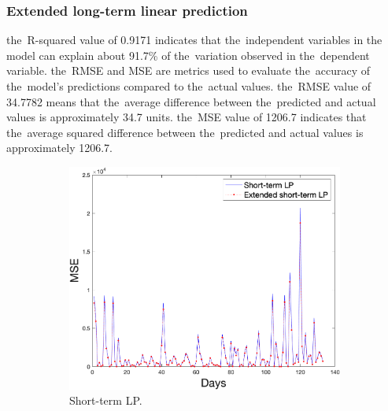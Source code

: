     \subsubsection{Extended long-term linear prediction} \label{subsec:res_eltlp}
     the~R-squared value of 0.9171 indicates that the~independent variables in the
    model can explain about 91.7\% of the~variation observed in the~dependent variable.
     the~RMSE and MSE are metrics used to evaluate the~accuracy of the~model's predictions
    compared to the~actual values. the~RMSE value of 34.7782 means that the~average difference
    between the~predicted and actual values is approximately 34.7 units. the~MSE value of
    1206.7 indicates that the~average squared difference between the~predicted and actual
    values is approximately 1206.7.\\
    \begin{figure}[!ht]
        \centering
        \begin{subfigure}[b]{0.4\textwidth}
            \includegraphics[width=1\textwidth]{figures/mseLP.png}
            \caption{Short-term LP.}
            \label{fig:ltlp}
        \end{subfigure}
        \hspace{0.1\textwidth}
        \begin{subfigure}[b]{0.4\textwidth}

\end{subfigure}
\end{figure}
